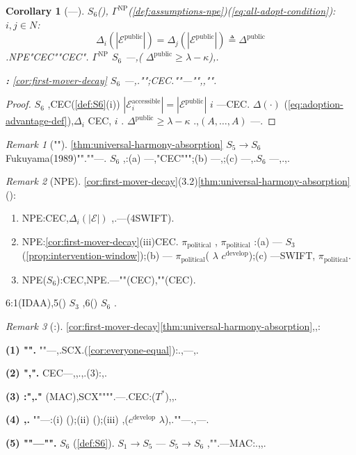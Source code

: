 \documentclass[12pt,a4paper]{article}
\newtheorem{corollary}[theorem]{Corollary}
\theoremstyle{definition}
\theoremstyle{remark}
\newtheorem{remark}{Remark}[section]
\begin{document}
\begin{corollary}[---]
\label{cor:S6-adoption-equivalence}
 $S_6$(), $\Gamma^{\text{NP}}$(\ref{def:assumptions-npe})(\ref{eq:all-adopt-condition}): $i, j \in N$:
\begin{equation}
\Delta_i(|\mathcal{E}^{\text{public}}|) = \Delta_j(|\mathcal{E}^{\text{public}}|) \triangleq \Delta^{\text{public}}
\end{equation}
.NPE"CEC""CEC". $\Gamma^{\text{NP}}$  $S_6$ ---,( $\Delta^{\text{public}} \geq \lambda - \kappa$),.

\textbf{:} \ref{cor:first-mover-decay} $S_6$ ---,\textit{}."";CEC.""---"",,"".
\end{corollary}

\begin{proof}
 $S_6$ ,CEC(\ref{def:S6}(i)) $|\mathcal{E}_i^{\text{accessible}}| = |\mathcal{E}^{\text{public}}|$  $i$ ---CEC. $\Delta(\cdot)$ (\ref{eq:adoption-advantage-def}),$\Delta_i$ CEC, $i$ . $\Delta^{\text{public}} \geq \lambda - \kappa$ .,$(A, \ldots, A)$ ---.
\end{proof}

\begin{remark}[""]
\ref{thm:universal-harmony-absorption} $S_5 \to S_6$  Fukuyama(1989)"".""---\textit{}. $S_6$ ,:(a) ---,"CEC""";(b) ---,;(c) ---,.$S_6$ \textit{}---,.,.
\end{remark}

\begin{remark}[NPE]
\ref{cor:first-mover-decay}(3.2)\ref{thm:universal-harmony-absorption}():

\begin{enumerate}[label=(\arabic*), leftmargin=*]
\item NPE\textit{}:CEC,$\Delta_i(|\mathcal{E}|)$ ,.---(4SWIFT).

\item NPE\textit{}:\ref{cor:first-mover-decay}(iii)CEC. $\pi_{\text{political}}$ , $\pi_{\text{political}}$ :(a) --- $S_3$ (\ref{prop:intervention-window});(b) --- $\pi_{\text{political}}$( $\lambda$  $c^{\text{develop}}$);(c) ---SWIFT, $\pi_{\text{political}}$.

\item NPE\textit{}($S_6$):CEC,NPE.---""(CEC),""(CEC).
\end{enumerate}

6:1(IDAA),5() $S_3$ ,6() $S_6$ .
\end{remark}

\begin{remark}[:]
\label{rem:first-mover-duty}
\ref{cor:first-mover-decay}\ref{thm:universal-harmony-absorption},,:

\textbf{(1) "".} ""---,.SCX.(\ref{cor:everyone-equal}):.,---,.

\textbf{(2) ",".} CEC---,,.,.(3):,.

\textbf{(3) :",."} (MAC),SCX"""".---.CEC:($T^*$),,.

\textbf{(4) ,.} ""---:(i) ();(ii) ();(iii) ,($c^{\text{develop}}$  $\lambda$),.""---.,---.

\textbf{(5) ""---"".} $S_6$ (\ref{def:S6}). $S_1 \to S_5$ --- $S_5 \to S_6$ ,"".---MAC:.,,.
\end{remark}
\end{document}
